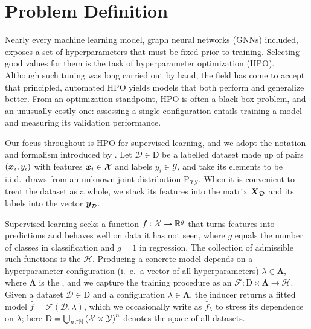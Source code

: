 \section{Problem Definition}
\label{sec:problem-definition}

Nearly every machine learning model, graph neural networks (GNNs) included, exposes a set of hyperparameters that must be fixed prior to training. Selecting good values for them is the task of hyperparameter optimization (HPO). Although such tuning was long carried out by hand, the field has come to accept that principled, automated HPO yields models that both perform and generalize better. From an optimization standpoint, HPO is often a black-box problem, and an unusually costly one: assessing a single configuration entails training a model and measuring its validation performance.

Our focus throughout is HPO for supervised learning, and we adopt the notation and formalism introduced by \cite{bischl_hyperparameter_2023}. Let \( \mathcal{D} \in \mathrm{D} \) be a labelled dataset made up of pairs \( \left( \boldsymbol{x}_i, y_i \right) \) with features \( \boldsymbol{x}_i \in \mathcal{X} \) and labels \( y_i \in \mathcal{Y} \), and take its elements to be i.i.d.\ draws from an unknown joint distribution \( \mathrm{P}_{\mathcal{X}\mathcal{Y}} \). When it is convenient to treat the dataset as a whole, we stack its features into the matrix \( \boldsymbol{X}_{\mathcal{D}} \) and its labels into the vector \( \boldsymbol{y}_{\mathcal{D}} \).

Supervised learning seeks a function \( f: \mathcal{X} \to \mathbb{R}^g \) that turns features into predictions and behaves well on data it has not seen, where \( g \) equals the number of classes in classification and \( g = 1 \) in regression. The collection of admissible such functions is the  \( \mathscr{H} \). Producing a concrete model depends on a hyperparameter configuration (i.\ e.\ a vector of all hyperparameters) \( \lambda \in \boldsymbol\Lambda \), where \( \boldsymbol\Lambda \) is the , and we capture the training procedure as an  \( \mathscr{F} : \mathrm{D} \times \boldsymbol\Lambda \to \mathscr{H} \). Given a dataset \( \mathcal{D} \in \mathrm{D} \) and a configuration \( \lambda \in \boldsymbol\Lambda \), the inducer returns a fitted model \( \hat{f} = \mathscr{F} ( \mathcal{D}, \lambda ) \), which we occasionally write as \( \hat{f}_\lambda \) to stress its dependence on \( \lambda \); here \( \mathrm{D} = \bigcup_{n \in \mathbb{N}} \left( \mathcal{X} \times \mathcal{Y} \right)^n \) denotes the space of all datasets.

